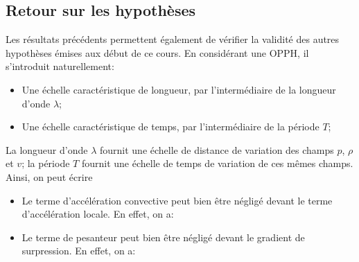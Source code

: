 \documentclass[a4paper, 12pt]{article}
\begin{document}
\subsection{Retour sur les hypothèses}

Les résultats précédents permettent également de vérifier la validité des autres hypothèses émises aux début de ce cours. En considérant une OPPH, il s'introduit naturellement:
\begin{itemize}
\item Une échelle caractéristique de longueur, par l'intermédiaire de la longueur d'onde $\lambda$;
\item Une échelle caractéristique de temps, par l'intermédiaire de la période $T$;
\end{itemize}

La longueur d'onde $\lambda$ fournit une échelle de distance de variation des champs $p$, $\rho$ et $v$; la période $T$ fournit une échelle de temps de variation de ces mêmes champs. Ainsi, on peut écrire

\noindent{}

\begin{itemize}
\item Le terme d'accélération convective peut bien être négligé devant le terme d'accélération locale. En effet, on a:
\end{itemize}
\begin{center}
\end{center}

\begin{itemize}
\item Le terme de pesanteur peut bien être négligé devant le gradient de surpression. En effet, on a:
\end{itemize}
\begin{center}
\end{center}
\end{document}
